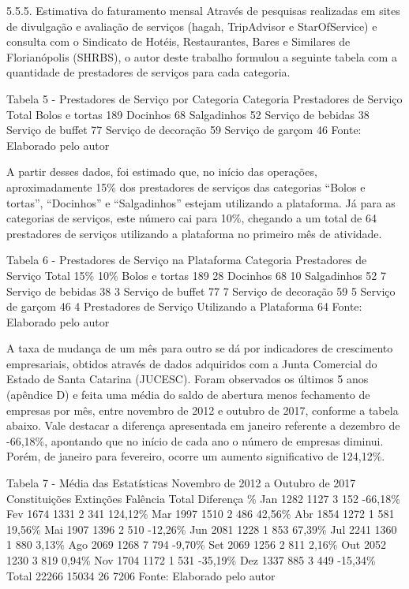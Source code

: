 5.5.5. Estimativa do faturamento mensal 
Através de pesquisas realizadas em sites de divulgação e avaliação de serviços (hagah, TripAdvisor e StarOfService) e consulta com o Sindicato de Hotéis, Restaurantes, Bares e Similares de Florianópolis (SHRBS), o autor deste trabalho formulou a seguinte tabela com a quantidade de prestadores de serviços para cada categoria. 

Tabela 5 - Prestadores de Serviço por Categoria 
Categoria	Prestadores de Serviço Total
Bolos e tortas	189
Docinhos	68
Salgadinhos	52
Serviço de bebidas	38
Serviço de buffet	77
Serviço de decoração	59
Serviço de garçom	46
Fonte: Elaborado pelo autor 

A partir desses dados, foi estimado que, no início das operações, aproximadamente 15\% dos prestadores de serviços das categorias “Bolos e tortas”, “Docinhos” e “Salgadinhos” estejam utilizando a plataforma. Já para as categorias de serviços, este número cai para 10\%, chegando a um total de 64 prestadores de serviços utilizando a plataforma no primeiro mês de atividade. 

Tabela 6 - Prestadores de Serviço na Plataforma 
Categoria	Prestadores de Serviço Total	15\%	10\%
Bolos e tortas	189	28	
Docinhos	68	10	
Salgadinhos	52	7	
Serviço de bebidas	38		3
Serviço de buffet	77		7
Serviço de decoração	59		5
Serviço de garçom	46		4
Prestadores de Serviço Utilizando a Plataforma	64
Fonte: Elaborado pelo autor 

A taxa de mudança de um mês para outro se dá por indicadores de crescimento empresariais, obtidos através de dados adquiridos com a Junta Comercial do Estado de Santa Catarina (JUCESC). Foram observados os últimos 5 anos (apêndice D) e feita uma média do saldo de abertura menos fechamento de empresas por mês, entre novembro de 2012 e outubro de 2017, conforme a tabela abaixo. Vale destacar a diferença apresentada em janeiro referente a dezembro de -66,18\%, apontando que no início de cada ano o número de empresas diminui. Porém, de janeiro para fevereiro, ocorre um aumento significativo de 124,12\%. 

Tabela 7 - Média das Estatísticas Novembro de 2012 a Outubro de 2017 
Constituições	Extinções	Falência	Total	Diferença \%
Jan	1282	1127	3	152	-66,18\%
Fev	1674	1331	2	341	124,12\%
Mar	1997	1510	2	486	42,56\%
Abr	1854	1272	1	581	19,56\%
Mai	1907	1396	2	510	-12,26\%
Jun	2081	1228	1	853	67,39\%
Jul	2241	1360	1	880	3,13\%
Ago	2069	1268	7	794	-9,70\%
Set	2069	1256	2	811	2,16\%
Out	2052	1230	3	819	0,94\%
Nov	1704	1172	1	531	-35,19\%
Dez	1337	885	3	449	-15,34\%
Total	22266	15034	26	7206	
Fonte: Elaborado pelo autor 

